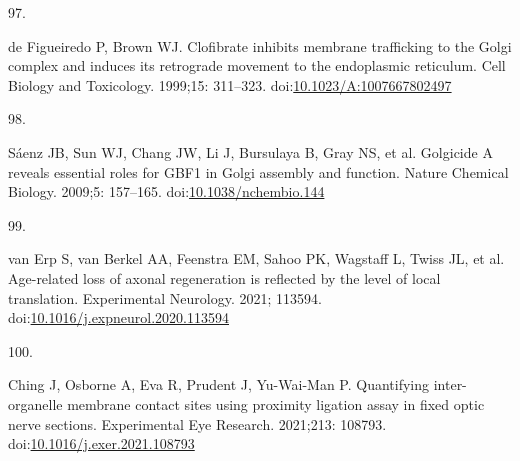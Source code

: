 \documentclass[
  12pt,
  a4paper,
]{book}
\newlength{\cslhangindent}
\newlength{\csllabelwidth}
\newlength{\cslentryspacingunit} %
\newenvironment{CSLReferences}[2] %
 {%
  \setlength{\parindent}{0pt}
  \ifodd #1
  \let\oldpar\par
  \def\par{\hangindent=\cslhangindent\oldpar}
  \fi
  \setlength{\parskip}{#2\cslentryspacingunit}
 }%
 {}
\newcommand{\CSLLeftMargin}[1]{\parbox[t]{\csllabelwidth}{#1}}
\newcommand{\CSLRightInline}[1]{\parbox[t]{\linewidth - \csllabelwidth}{#1}\break}
\begin{document}
\begin{CSLReferences}{0}{0}
\leavevmode{}%
\CSLLeftMargin{97. }%
\CSLRightInline{de Figueiredo P, Brown WJ. Clofibrate inhibits membrane trafficking to the {Golgi} complex and induces its retrograde movement to the endoplasmic reticulum. Cell Biology and Toxicology. 1999;15: 311--323. doi:\href{https://doi.org/10.1023/A:1007667802497}{10.1023/A:1007667802497}}

\leavevmode{}%
\CSLLeftMargin{98. }%
\CSLRightInline{Sáenz JB, Sun WJ, Chang JW, Li J, Bursulaya B, Gray NS, et al. Golgicide {A} reveals essential roles for {GBF1} in {Golgi} assembly and function. Nature Chemical Biology. 2009;5: 157--165. doi:\href{https://doi.org/10.1038/nchembio.144}{10.1038/nchembio.144}}

\leavevmode{}%
\CSLLeftMargin{99. }%
\CSLRightInline{van Erp S, van Berkel AA, Feenstra EM, Sahoo PK, Wagstaff L, Twiss JL, et al. Age-related loss of axonal regeneration is reflected by the level of local translation. Experimental Neurology. 2021; 113594. doi:\href{https://doi.org/10.1016/j.expneurol.2020.113594}{10.1016/j.expneurol.2020.113594}}

\leavevmode{}%
\CSLLeftMargin{100. }%
\CSLRightInline{Ching J, Osborne A, Eva R, Prudent J, Yu-Wai-Man P. Quantifying inter-organelle membrane contact sites using proximity ligation assay in fixed optic nerve sections. Experimental Eye Research. 2021;213: 108793. doi:\href{https://doi.org/10.1016/j.exer.2021.108793}{10.1016/j.exer.2021.108793}}

\end{CSLReferences}
\end{document}
